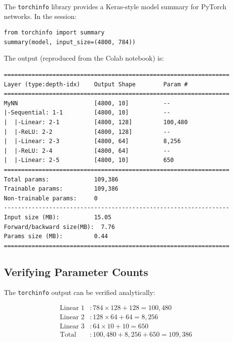 \documentclass[12pt,a4paper]{article}
\begin{document}
The \texttt{torchinfo} library provides a Keras-style model summary for
PyTorch networks.  In the session:

\begin{tcolorbox}[colback=gray!5!white, colframe=gray!60!black,
  fonttitle=\bfseries, title=Listing 7: torchinfo summary call]
\begin{verbatim}
from torchinfo import summary
summary(model, input_size=(4800, 784))
\end{verbatim}
\end{tcolorbox}

The output (reproduced from the Colab notebook) is:

\begin{tcolorbox}[colback=black!5!white, colframe=black!40!white,
  fonttitle=\bfseries, title=torchinfo Output for MyNN]
\begin{verbatim}
=================================================================
Layer (type:depth-idx)    Output Shape        Param #
=================================================================
MyNN                      [4800, 10]          --
|-Sequential: 1-1         [4800, 10]          --
|  |-Linear: 2-1          [4800, 128]         100,480
|  |-ReLU: 2-2            [4800, 128]         --
|  |-Linear: 2-3          [4800, 64]          8,256
|  |-ReLU: 2-4            [4800, 64]          --
|  |-Linear: 2-5          [4800, 10]          650
=================================================================
Total params:             109,386
Trainable params:         109,386
Non-trainable params:     0
-----------------------------------------------------------------
Input size (MB):          15.05
Forward/backward size(MB):  7.76
Params size (MB):         0.44
=================================================================
\end{verbatim}
\end{tcolorbox}

\subsection{Verifying Parameter Counts}
\label{subsec:verify-params}

The \texttt{torchinfo} output can be verified analytically:

\begin{align}
  \text{Linear 1} &: 784 \times 128 + 128 = 100{,}480 \label{eq:p1} \\
  \text{Linear 2} &: 128 \times 64  + 64  = 8{,}256   \label{eq:p2} \\
  \text{Linear 3} &: 64  \times 10  + 10  = 650        \label{eq:p3} \\
  \text{Total}    &: 100{,}480 + 8{,}256 + 650 = 109{,}386 \label{eq:ptotal}
\end{align}
\end{document}
